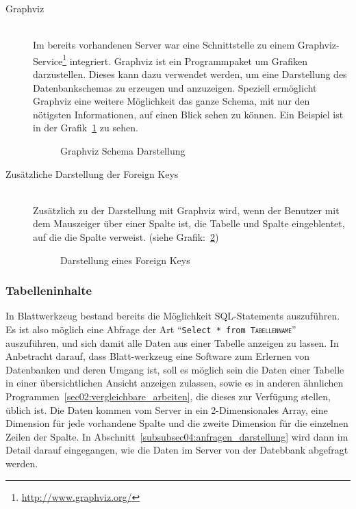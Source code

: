 \begin{description}
\item[Graphviz] \hfill\\
Im bereits vorhandenen Server war eine Schnittstelle zu einem Graphviz-Service\footnote{\url{http://www.graphviz.org/}} integriert. Graphviz ist ein Programmpaket um Grafiken darzustellen. Dieses kann dazu verwendet werden, um eine Darstellung des Datenbankschemas zu erzeugen und anzuzeigen. Speziell ermöglicht Graphviz eine weitere Möglichkeit das ganze Schema, mit nur den nötigsten Informationen, auf einen Blick sehen zu können.
Ein Beispiel ist in der Grafik~\ref{pic:graphviz_schema} zu sehen.

\begin{figure}[ht]
    \centering
    \caption{Graphviz Schema Darstellung}
    \label{pic:graphviz_schema}
\end{figure}

\item[Zusätzliche Darstellung der Foreign Keys] \hfill\\
Zusätzlich zu der Darstellung mit Graphviz wird, wenn der Benutzer mit dem Mauszeiger über einer Spalte ist, die Tabelle und Spalte eingeblentet, auf die die Spalte verweist. (siehe Grafik:~\ref{pic:table_fk_view})

\begin{figure}[ht]
    \centering
    \caption{Darstellung eines Foreign Keys}
    \label{pic:table_fk_view}
\end{figure}

\end{description}

\subsubsection{Tabelleninhalte}
\label{subsubsec04:table_content}

In Blattwerkzeug bestand bereits die Möglichkeit SQL-Statements auszuführen. Es ist also möglich eine Abfrage der Art ``\texttt{Select * from \textsc{Tabellenname}}'' auszuführen, und sich damit alle Daten aus einer Tabelle anzeigen zu lassen. In Anbetracht darauf, dass Blatt-werkzeug eine Software zum Erlernen von Datenbanken und deren Umgang ist, soll es möglich sein die Daten einer Tabelle in einer übersichtlichen Ansicht anzeigen zulassen, sowie es in anderen ähnlichen Programmen~\ref{sec02:vergleichbare_arbeiten}, die dieses zur Verfügung stellen, üblich ist.
Die Daten kommen vom Server in ein 2-Dimensionales Array, eine Dimension für jede vorhandene Spalte und die zweite Dimension für die einzelnen Zeilen der Spalte.
In Abschnitt~\ref{subsubsec04:anfragen_darstellung} wird dann im Detail darauf eingegangen, wie die Daten im Server von der Datebbank abgefragt werden.

